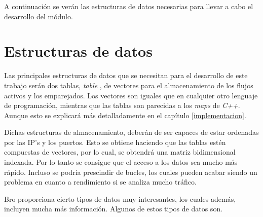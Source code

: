 \intro A continuación se verán las estructuras de datos necesarias para llevar a cabo el desarrollo del módulo.

\section{Estructuras de datos}

Las principales estructuras de datos que se necesitan para el desarrollo de este trabajo serán dos tablas, \textit{table} 
\cite{brotable}, de vectores para el almacenamiento de los flujos activos y los emparejados. Los vectores son iguales que en cualquier 
otro lenguaje de programación, mientras que las tablas son parecidas a los \textit{maps} de \textit{C++}. Aunque esto se explicará más 
detalladamente en el capítulo \ref{implementacion}.

\intro Dichas estructuras de almacenamiento, deberán de ser capaces de estar ordenadas por las IP's y los puertos. Esto se obtiene 
haciendo que las tablas estén compuestas de vectores, por lo cual, se obtendrá una matriz bidimensional indexada. Por lo tanto se 
consigue que el acceso a los datos sea mucho más rápido. Incluso se podría prescindir de bucles, los cuales pueden acabar 
siendo un problema en cuanto a rendimiento si se analiza mucho tráfico.

\intro Bro proporciona cierto tipos de datos muy interesantes, los cuales además, incluyen mucha más información. Algunos de estos 
tipos de datos son. 

